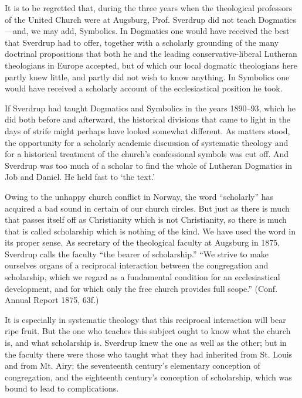 It is to be regretted that, during the three years when the theological professors of the United Church were at Augsburg, Prof. Sverdrup did not teach Dogmatics—and, we may add, Symbolics. In Dogmatics one would have received the best that Sverdrup had to offer, together with a scholarly grounding of the many doctrinal propositions that both he and the leading conservative-liberal Lutheran theologians in Europe accepted, but of which our local dogmatic theologians here partly knew little, and partly did not wish to know anything. In Symbolics one would have received a scholarly account of the ecclesiastical position he took.

If Sverdrup had taught Dogmatics and Symbolics in the years 1890–93, which he did both before and afterward, the historical divisions that came to light in the days of strife might perhaps have looked somewhat different. As matters stood, the opportunity for a scholarly academic discussion of systematic theology and for a historical treatment of the church’s confessional symbols was cut off. And Sverdrup was too much of a scholar to find the whole of Lutheran Dogmatics in Job and Daniel. He held fast to ‘the text.’

Owing to the unhappy church conflict in Norway, the word “scholarly” has acquired a bad sound in certain of our church circles. But just as there is much that passes itself off as Christianity which is not Christianity, so there is much that is called scholarship which is nothing of the kind. We have used the word in its proper sense. As secretary of the theological faculty at Augsburg in 1875, Sverdrup calls the faculty “the bearer of scholarship.” “We strive to make ourselves organs of a reciprocal interaction between the congregation and scholarship, which we regard as a fundamental condition for an ecclesiastical development, and for which only the free church provides full scope.” (Conf. Annual Report 1875, 63f.)

It is especially in systematic theology that this reciprocal interaction will bear ripe fruit. But the one who teaches this subject ought to know what the church is, and what scholarship is. Sverdrup knew the one as well as the other; but in the faculty there were those who taught what they had inherited from St. Louis and from Mt. Airy: the seventeenth century’s elementary conception of congregation, and the eighteenth century’s conception of scholarship, which was bound to lead to complications.

